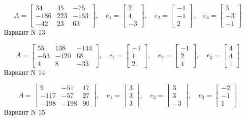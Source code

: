 \documentclass[11pt]{report}
\begin{document}
$$A = \left[\begin{matrix}34 & 45 & -75\\-186 & 223 & -153\\-42 & 23 & 63\end{matrix}\right],\quad e_1 = \left[\begin{matrix}2\\4\\-3\end{matrix}\right],\quad e_2 = \left[\begin{matrix}-1\\-1\\2\end{matrix}\right],\quad e_3 = \left[\begin{matrix}3\\-3\\-1\end{matrix}\right]$$Вариант N 13

$$A = \left[\begin{matrix}55 & 138 & -144\\-53 & -120 & 68\\4 & 8 & -33\end{matrix}\right],\quad e_1 = \left[\begin{matrix}-1\\1\\2\end{matrix}\right],\quad e_2 = \left[\begin{matrix}-1\\2\\4\end{matrix}\right],\quad e_3 = \left[\begin{matrix}4\\4\\1\end{matrix}\right]$$Вариант N 14

$$A = \left[\begin{matrix}9 & -51 & 17\\-117 & -57 & 27\\-198 & -198 & 90\end{matrix}\right],\quad e_1 = \left[\begin{matrix}3\\3\\3\end{matrix}\right],\quad e_2 = \left[\begin{matrix}3\\3\\-3\end{matrix}\right],\quad e_3 = \left[\begin{matrix}-2\\-1\\1\end{matrix}\right]$$Вариант N 15
\end{document}
